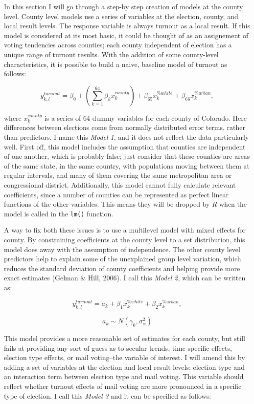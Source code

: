 \documentclass[12pt,twoside]{reedthesis}
\begin{document}
  In this section I will go through a step-by step creation of models at
  the county level. County level models use a series of variables at the
  election, county, and local result levels. The response variable is
  always turnout as a local result. If this model is considered at its
  most basic, it could be thought of as an assignement of voting
  tendencies across counties; each county independent of election has a
  unique range of turnout results. With the addition of some county-level
  characteristics, it is possible to build a naive, baseline model of
  turnout as follows:
  
  \[y^{turnout}_{k,l} = \beta_0 + (\sum_{k=1}^{64}\beta_kx_k^{county}) + \beta_{65}x_k^{\% white} + \beta_{66}x_k^{\%urban},\]
  
  where \(x_k^{county}\) is a series of 64 dummy variables for each county
  of Colorado. Here differences between elections come from normally
  distributed error terms, rather than predictors. I name this \emph{Model
  1}, and it does not reflect the data particularly well. First off, this
  model includes the assumption that counties are independent of one
  another, which is probably false; just consider that these counties are
  areas of the same state, in the same country, with populations moving
  between them at regular intervals, and many of them covering the same
  metropolitan area or congressional district. Additionally, this model
  cannot fully calculate relevant coefficients, since a number of counties
  can be represented as perfect linear functions of the other variables.
  This means they will be dropped by \textit{R} when the model is called
  in the \texttt{lm()} function.
  
  A way to fix both these issues is to use a multilevel model with mixed
  effects for county. By constraining coefficients at the county level to
  a set distribution, this model does away with the assumption of
  independence. The other county level predictors help to explain some of
  the unexplained group level variation, which reduces the standard
  deviation of county coefficients and helping provide more exact
  estimates (Gelman \& Hill, 2006). I call this \emph{Model 2}, which can
  be written as:
  
  \[y^{turnout}_{k,l} = a_{k} + \beta_{1}x_k^{\%white} + \beta_{2}x_k^{\%urban},\]
  
  \[a_{k} \sim N (\gamma_0, \sigma_{\alpha}^2)\]
  
  This model provides a more reasonable set of estimates for each county,
  but still fails at providing any sort of guess as to secular trends,
  time-specific effects, election type effects, or mail voting--the
  variable of interest. I will amend this by adding a set of variables at
  the election and local result levels: election type and an interaction
  term between election type and mail voting. This variable should reflect
  whether turnout effects of mail voting are more pronounced in a specific
  type of election. I call this \emph{Model 3} and it can be specified as
  follows:
  
\end{document}
